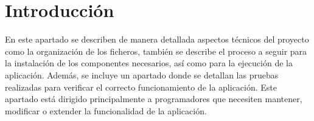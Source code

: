 \label{apendice:tecnica}

\section{Introducción}
En este apartado se describen de manera detallada aspectos técnicos del proyecto como la organización de los ficheros, también se describe el proceso a seguir para la instalación de los componentes necesarios, así como para la ejecución de la aplicación. Además, se incluye un apartado donde se detallan las pruebas realizadas para verificar el correcto funcionamiento de la aplicación. Este apartado está dirigido principalmente a programadores que necesiten mantener, modificar o extender la funcionalidad de la aplicación.

